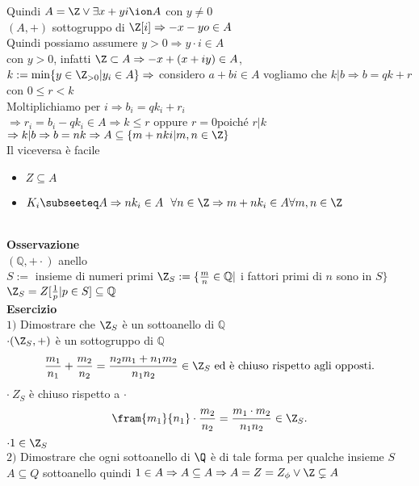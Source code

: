 \documentclass[12px]{article}
\begin{document}
	       Quindi $A = \Z \vee \exists x + yi\ion A$ con $y\neq 0$\\
	       $(A,+)$ sottogruppo di $\Z[i] \Rightarrow -x-yo\in A$ \\
	       Quindi possiamo assumere $y > 0 \Rightarrow y\cdot i \in A$ \\
	       con $y > 0$, infatti $\Z\subset A \Rightarrow -x + (x + iy)\in A$, \\
	       $k := \min\{y\in \Z_{>0}|y_i\in A\} \Rightarrow $ considero $a + bi\in A$ vogliamo che  $k | b \Rightarrow b = qk + r $ con $0\leq r < k$\\
	       Moltiplichiamo per  $i \Rightarrow b_i = qk_i + r_i$ \\
	       $ \Rightarrow r_i = b_i - qk_i \in A \Rightarrow k\leq r$ oppure $r = 0$\hfill poiché $r|k$\\
	       $ \Rightarrow  k|b \Rightarrow b = nk \Rightarrow  A\subseteq \{m + nki | m,n\in \Z\}$ \\
	       Il viceversa è facile
	       \begin{itemize}
		       \item $Z\subseteq A$
		       \item $K_i\subseeteq A  \Rightarrow nk_i\in A \ \ \forall n\in \Z \Rightarrow m + nk_i\in A\forall m,n\in \Z$
	       \end{itemize}\\
	       \textbf{Osservazione}\\
	       $(\mathbb Q, + \cdot)$ anello\\
	       $S:=$ insieme di numeri primi $\Z_S := \{\frac mn\in \mathbb Q |$ i fattori primi di  $n$ sono in $S\}$\\
	       $\Z_S = Z[\frac 1p|p\in S]\subseteq \mathbb Q$\\
	       \textbf{Esercizio}\\
	       $1)$ Dimostrare che $\Z_S$ è un sottoanello di $\mathbb Q$\\
	        $\cdot (\Z_S,+)$ è un sottogruppo di $\mathbb Q$
		 \[
			 \frac {m_1}{n_1} + \frac {m_2}{n_2} = \frac{n_2m_1+n_1m_2}{n_1n_2}\in \Z_S \text{ ed è chiuso rispetto agli opposti}
		.\] 
		$\cdot \ Z_S$ è chiuso rispetto a $\cdot$ \\
		\[
			\fram {m_1}{n_1}\cdot\frac{m_2}{n_2} = \frac{m_1\cdot m_2}{n_1n_2}\in \Z_S
		.\] 
		$\cdot 1\in \Z_S$\\
		 $ 2)$ Dimostrare che ogni sottoanello di $\Q$ è di tale forma per qualche insieme $S$  $A\subseteq Q$ sottoanello quindi $1\in A \Rightarrow  A\subseteq A \Rightarrow  A = Z = Z_\phi \vee \Z\subsetneq A$ \\
\end{document}
